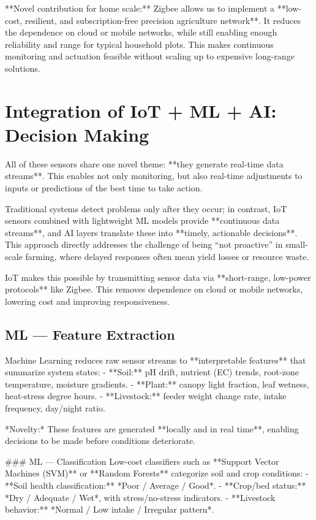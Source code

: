 \documentclass{sigchi}
\begin{document}
**Novel contribution for home scale:** Zigbee allows us to implement a **low-cost, resilient, and subscription-free precision agriculture network**. It reduces the dependence on cloud or mobile networks, while still enabling enough reliability and range for typical household plots. This makes continuous monitoring and actuation feasible without scaling up to expensive long-range solutions.

\section{Integration of IoT + ML + AI: Decision Making}

All of these sensors share one novel theme: **they generate real-time data streams**. This enables not only monitoring, but also real-time adjustments to inputs or predictions of the best time to take action.

Traditional systems detect problems only after they occur; in contrast, IoT sensors combined with lightweight ML models provide **continuous data streams**, and AI layers translate these into **timely, actionable decisions**. This approach directly addresses the challenge of being “not proactive” in small-scale farming, where delayed responses often mean yield losses or resource waste.

IoT makes this possible by transmitting sensor data via **short-range, low-power protocols** like Zigbee. This removes dependence on cloud or mobile networks, lowering cost and improving responsiveness.

\subsection{ML — Feature Extraction}

Machine Learning reduces raw sensor streams to **interpretable features** that summarize system states:
- **Soil:** pH drift, nutrient (EC) trends, root-zone temperature, moisture gradients.
- **Plant:** canopy light fraction, leaf wetness, heat-stress degree hours.
- **Livestock:** feeder weight change rate, intake frequency, day/night ratio.

*Novelty:* These features are generated **locally and in real time**, enabling decisions to be made before conditions deteriorate.

### ML — Classification
Low-cost classifiers such as **Support Vector Machines (SVM)** or **Random Forests** categorize soil and crop conditions:
- **Soil health classification:** *Poor / Average / Good*.
- **Crop/bed status:** *Dry / Adequate / Wet*, with stress/no-stress indicators.
- **Livestock behavior:** *Normal / Low intake / Irregular pattern*.
\end{document}

